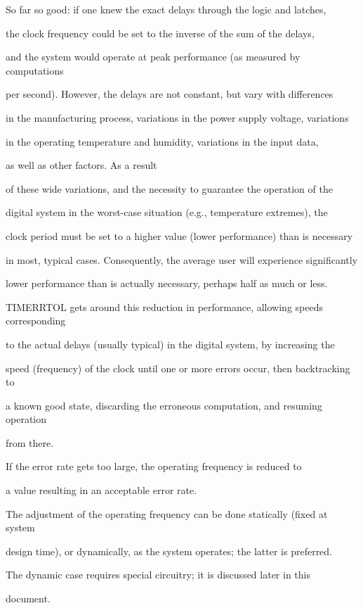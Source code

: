 \documentclass[12pt,dvips]{article}
\begin{document}
So far so good: if one knew the exact delays through the logic and latches,

the clock frequency could be set to the inverse of the sum of the delays,

and the system would operate at peak performance (as measured by computations

per second). However, the delays are not constant, but vary with differences

in the manufacturing process, variations in the power supply voltage, variations

in the operating temperature and humidity, variations in the input data,

as well as other factors. As a result

of these wide variations, and the necessity to guarantee the operation of the

digital system in the worst-case situation (e.g., temperature extremes), the

clock period must be set to a higher value (lower performance) than is necessary

in most, typical cases. Consequently, the average user will experience significantly

lower performance than is actually necessary, perhaps half as much or less.



TIMERRTOL gets around this reduction in performance, allowing speeds corresponding

to the actual delays (usually typical) in the digital system, by increasing the

speed (frequency) of the clock until one or more errors occur, then backtracking to

a known good state, discarding the erroneous computation, and resuming operation

from there.

If the error rate gets too large, the operating frequency is reduced to

a value resulting in an acceptable error rate.

The adjustment of the operating frequency can be done statically (fixed at system

design time), or dynamically, as the system operates; the latter is preferred.

The dynamic case requires special circuitry; it is discussed later in this

document.
\end{document}
